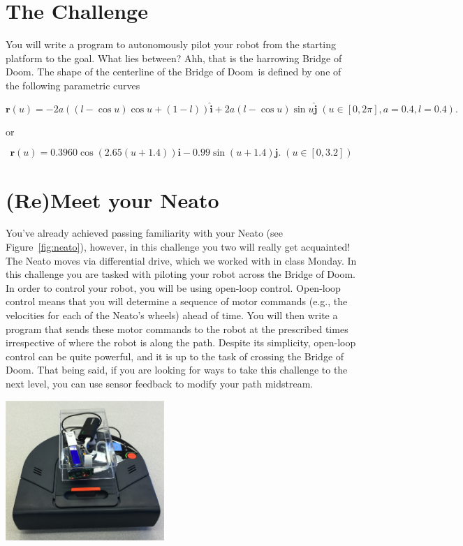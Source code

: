 \documentclass{tufte-handout}
\def \BoD {Bridge of Doom\texttrademark}
\begin{document}
\section{The Challenge}
You will write a program to autonomously pilot your robot from the starting platform to the goal.  What lies between?  Ahh, that is the harrowing \BoD.  The shape of the centerline of the \BoD~is defined by one of the following parametric curves

\[\mathbf{r}(u) =  -2a\left(\left(l - \cos u \right) \cos u +\left(1 - l\right)\right) \hat{\mathbf{i}} + 2a (l - \cos u) \sin u \hat{\mathbf{j}} \; (u \in [0,2\pi], a = 0.4, l = 0.4). \]

or

\[\mathbf{r}(u) =  0.3960 \cos(2.65(u+1.4)) \mathbf{i} - 0.99 \sin(u+1.4) \mathbf{j}. \; (u \in [0,3.2]) \]

\section{(Re)Meet your Neato}

You've already achieved passing familiarity with your Neato (see Figure~\ref{fig:neato}), however, in this challenge you two will really get acquainted!  The Neato moves via differential drive, which we worked with in class Monday.  In this challenge you are tasked with piloting your robot across the \BoD.  In order to control your robot, you will be using open-loop control.  Open-loop control means that you will determine a sequence of motor commands (e.g., the velocities for each of the Neato's wheels) ahead of time.  You will then write a program that sends these motor commands to the robot at the prescribed times irrespective of where the robot is along the path.  Despite its simplicity, open-loop control can be quite powerful, and it is up to the task of crossing the \BoD.  That being said, if you are looking for ways to take this challenge to the next level, you can use sensor feedback to modify your path midstream.


\begin{marginfigure}
\includegraphics[width=6cm]{figures/neato.png}
\caption{The Neato in all its glory. The Neato will be your bot for the duration of this module.\label{fig:neato}}
\end{marginfigure}
\end{document}
